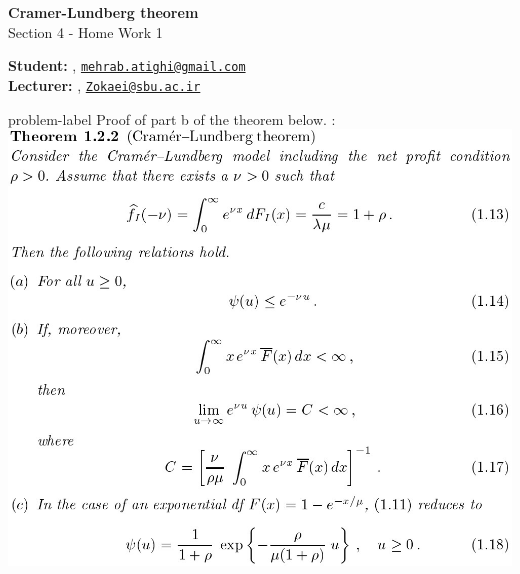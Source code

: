 	






		\begin{Large}
		\textsf{\textbf{Cramer-Lundberg theorem}}\\
		Section 4 - Home Work 1
	\end{Large}
	
	\vspace{1ex}
	
	\textsf{\textbf{Student:}} , \href{mailto:mehrab.atighi@gmail.com}{\texttt{mehrab.atighi@gmail.com}}\\
	\textsf{\textbf{Lecturer:}} , \href{mailto:Zokaei@sbu.ac.ir}{\texttt{Zokaei@sbu.ac.ir}}
	
	
	\vspace{2ex}
	
	\begin{problem}{}{problem-label}
		Proof of part b of the theorem below. \cite{Embrechts.etal1997}:
		\includegraphics[width = \textwidth]{pic1.jpg}
	\end{problem}
	
